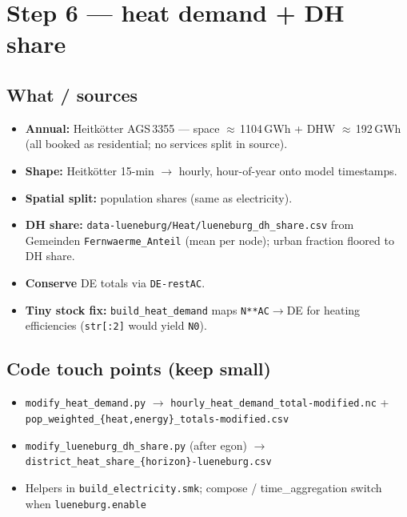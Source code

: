 \documentclass[11pt,a4paper]{article}
\begin{document}
\section{Step 6 --- heat demand + DH share}

\noindent{}

\vspace{0.8em}

\subsection{What / sources}
\begin{itemize}[leftmargin=*]
  \item \textbf{Annual:} Heitkötter AGS\,3355 --- space $\approx$\,1104\,GWh + DHW $\approx$\,192\,GWh
        (all booked as residential; no services split in source).
  \item \textbf{Shape:} Heitkötter 15-min $\to$ hourly, hour-of-year onto model timestamps.
  \item \textbf{Spatial split:} population shares (same as electricity).
  \item \textbf{DH share:} \texttt{data-lueneburg/Heat/lueneburg\_dh\_share.csv} from Gemeinden
        \texttt{Fernwaerme\_Anteil} (mean per node); urban fraction floored to DH share.
  \item \textbf{Conserve} DE totals via \texttt{DE-restAC}.
  \item \textbf{Tiny stock fix:} \texttt{build\_heat\_demand} maps \texttt{N**AC}$\to$DE
        for heating efficiencies (\texttt{str[:2]} would yield \texttt{N0}).
\end{itemize}

\subsection{Code touch points (keep small)}
\begin{itemize}[leftmargin=*]
  \item \texttt{modify\_heat\_demand.py} $\to$
        \texttt{hourly\_heat\_demand\_total-modified.nc} +
        \texttt{pop\_weighted\_\{heat,energy\}\_totals-modified.csv}
  \item \texttt{modify\_lueneburg\_dh\_share.py} (after egon)
        $\to$ \texttt{district\_heat\_share\_\{horizon\}-lueneburg.csv}
  \item Helpers in \texttt{build\_electricity.smk}; compose / time\_aggregation switch
        when \texttt{lueneburg.enable}
\end{itemize}
\end{document}
